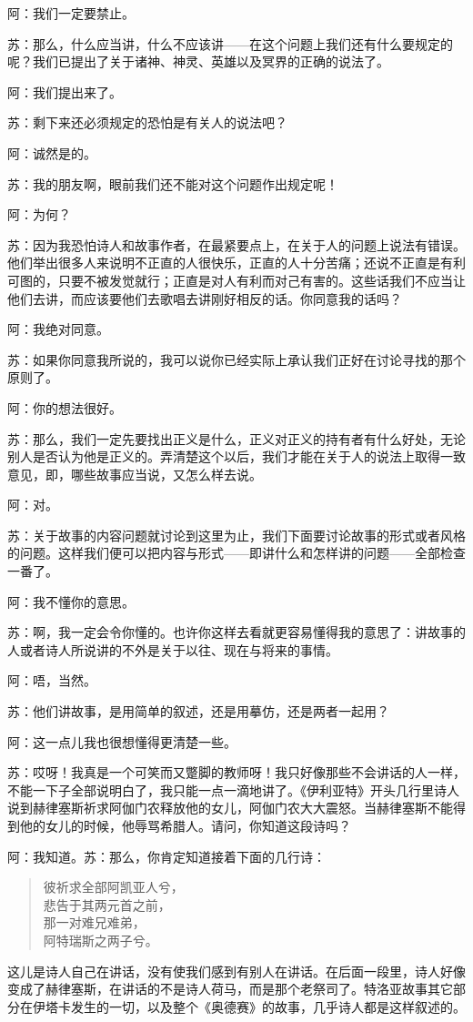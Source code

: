 \documentclass[11pt,oneside]{book}
\begin{document}
\begin{common-format}
阿：我们一定要禁止。

苏：那么，什么应当讲，什么不应该讲——在这个问题上我们还有什么要规定的呢？我们已提出了关于诸神、神灵、英雄以及冥界的正确的说法了。

阿：我们提出来了。

苏：剩下来还必须规定的恐怕是有关人的说法吧？

阿：诚然是的。

苏：我的朋友啊，眼前我们还不能对这个问题作出规定呢！

阿：为何？

苏：因为我恐怕诗人和故事作者，在最紧要点上，在关于人的问题上说法有错误。他们举出很多人来说明不正直的人很快乐，正直的人十分苦痛；还说不正直是有利可图的，只要不被发觉就行；正直是对人有利而对己有害的。这些话我们不应当让他们去讲，而应该要他们去歌唱去讲刚好相反的话。你同意我的话吗？

阿：我绝对同意。

苏：如果你同意我所说的，我可以说你已经实际上承认我们正好在讨论寻找的那个原则了。

阿：你的想法很好。

苏：那么，我们一定先要找出正义是什么，正义对正义的持有者有什么好处，无论别人是否认为他是正义的。弄清楚这个以后，我们才能在关于人的说法上取得一致意见，即，哪些故事应当说，又怎么样去说。

阿：对。

苏：关于故事的内容问题就讨论到这里为止，我们下面要讨论故事的形式或者风格的问题。这样我们便可以把内容与形式——即讲什么和怎样讲的问题——全部检查一番了。

阿：我不懂你的意思。

苏：啊，我一定会令你懂的。也许你这样去看就更容易懂得我的意思了：讲故事的人或者诗人所说讲的不外是关于以往、现在与将来的事情。

阿：唔，当然。

苏：他们讲故事，是用简单的叙述，还是用摹仿，还是两者一起用？

阿：这一点儿我也很想懂得更清楚一些。

苏：哎呀！我真是一个可笑而又蹩脚的教师呀！我只好像那些不会讲话的人一样，不能一下子全部说明白了，我只能一点一滴地讲了。《伊利亚特》开头几行里诗人说到赫律塞斯祈求阿伽门农释放他的女儿，阿伽门农大大震怒。当赫律塞斯不能得到他的女儿的时候，他辱骂希腊人。请问，你知道这段诗吗？

阿：我知道。苏：那么，你肯定知道接着下面的几行诗：
\begin{verse}
彼祈求全部阿凯亚人兮，\\
悲告于其两元首之前，\\
那一对难兄难弟，\\
阿特瑞斯之两子兮。
\end{verse}
这儿是诗人自己在讲话，没有使我们感到有别人在讲话。在后面一段里，诗人好像变成了赫律塞斯，在讲话的不是诗人荷马，而是那个老祭司了。特洛亚故事其它部分在伊塔卡发生的一切，以及整个《奥德赛》的故事，几乎诗人都是这样叙述的。


\end{common-format}
\end{document}
